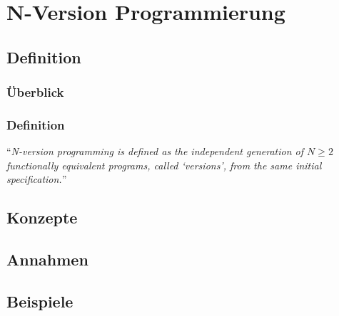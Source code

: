 \section{N-Version Programmierung}
\subsection{Definition}
%
%
\begin{frame}
	\frametitle{Überblick}
	\tableofcontents[currentsubsection]
\end{frame}
%
%
\begin{frame}
	\frametitle{Definition}
	\enquote{\emph{N-version programming is defined as the independent generation of $ N \geq 2 $ functionally equivalent programs, called \enquote{versions}, from the same initial specification.}} \cite{Chen1978}

\end{frame}
%
\subsection{Konzepte}
%
\subsection{Annahmen}
%
\subsection{Beispiele}
%
